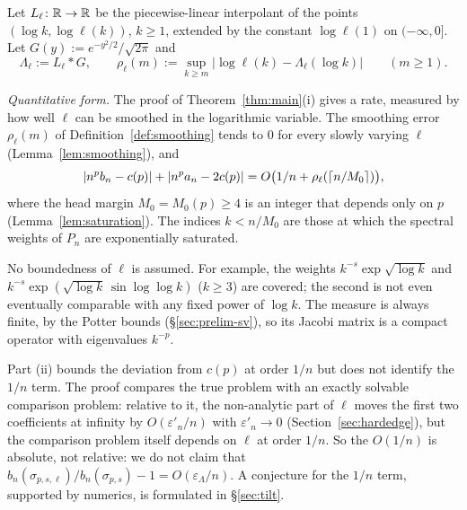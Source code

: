\begin{definition}[smoothing]\label{def:smoothing}
Let $L_\ell\colon\mathbb{R}\to\mathbb{R}$ be the piecewise-linear interpolant of the points $(\log k,\log\ell(k))$, $k\ge1$, extended
by the constant $\log\ell(1)$ on $(-\infty,0]$. Let $G(y):=e^{-y^2/2}/\sqrt{2\pi}$ and
\begin{equation}\label{eq:smoothing}
  \Lambda_\ell:=L_\ell*G,\qquad
  \rho_\ell(m):=\sup_{k\ge m}\bigl|\log\ell(k)-\Lambda_\ell(\log k)\bigr|\qquad(m\ge1).
\end{equation}
\end{definition}

\emph{Quantitative form.} The proof of Theorem~\ref{thm:main}(i) gives a rate, measured by how well $\ell$ can be
smoothed in the logarithmic variable. The smoothing error $\rho_\ell(m)$ of Definition~\ref{def:smoothing} tends to
$0$ for every slowly varying $\ell$ (Lemma~\ref{lem:smoothing}), and
\begin{equation}\label{eq:main-rate}
  |n^pb_n-c(p)|+|n^pa_n-2c(p)|=O\bigl(1/n+\rho_\ell(\lceil n/M_0\rceil)\bigr),
\end{equation}
where the head margin $M_0=M_0(p)\ge4$ is an integer that depends only on $p$ (Lemma~\ref{lem:saturation}). The
indices $k<n/M_0$ are those at which the spectral weights of $P_n$ are exponentially saturated.


\begin{remark}\label{rem:main-finite}
No boundedness of $\ell$ is assumed. For example, the weights $k^{-s}\exp\sqrt{\log k}$ and
$k^{-s}\exp(\sqrt{\log k}\,\sin\log\log k)$ ($k\ge3$) are covered; the second is not even eventually comparable with
any fixed power of $\log k$. The measure is always finite, by the Potter bounds (\S\ref{sec:prelim-sv}), so its Jacobi
matrix is a compact operator with eigenvalues $k^{-p}$.
\end{remark}

\begin{remark}\label{rem:main-rate}\label{rem:engine-scope}
Part (ii) bounds the deviation from $c(p)$ at order $1/n$ but does not identify the $1/n$ term. The proof compares the
true problem with an exactly solvable comparison problem: relative to it, the non-analytic part of $\ell$ moves the
first two coefficients at infinity by $O(\varepsilon'_n/n)$ with $\varepsilon'_n\to0$ (Section~\ref{sec:hardedge}),
but the comparison problem itself depends on $\ell$ at order $1/n$. So the $O(1/n)$ is absolute, not relative: we do
not claim that $b_n(\sigma_{p,s,\ell})/b_n(\sigma_{p,s})-1=O(\varepsilon_\Lambda/n)$. A conjecture for the $1/n$ term,
supported by numerics, is formulated in \S\ref{sec:tilt}.
\end{remark}

